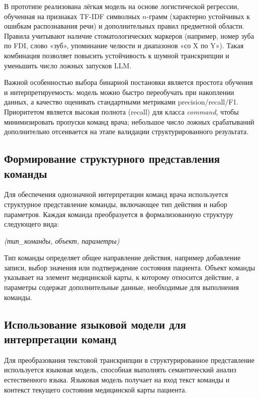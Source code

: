 В прототипе реализована лёгкая модель на основе логистической регрессии, обученная на признаках TF-IDF символных $n$-грамм (характерно устойчивых к ошибкам распознавания речи) и дополнительных правил предметной области.
Правила учитывают наличие стоматологических маркеров (например, номер зуба по FDI, слово «зуб», упоминание челюсти и диапазонов «со X по Y»).
Такая комбинация позволяет повысить устойчивость к шумной транскрипции и уменьшить число ложных запусков LLM.

Важной особенностью выбора бинарной постановки является простота обучения и интерпретируемость: модель можно быстро переобучать при накоплении данных, а качество оценивать стандартными метриками precision/recall/F1.
Приоритетом является высокая полнота (recall) для класса \textit{command}, чтобы минимизировать пропуски команд врача; небольшое число ложных срабатываний дополнительно отсеивается на этапе валидации структурированного результата.

\subsection{Формирование структурного представления команды}

Для обеспечения однозначной интерпретации команд врача используется структурное представление команды, включающее тип действия и набор параметров. Каждая команда преобразуется в формализованную структуру следующего вида:

\begin{center}
\textit{(тип\_команды, объект, параметры)}
\end{center}

Тип команды определяет общее направление действия, например добавление записи, выбор значения или подтверждение состояния пациента. Объект команды указывает на элемент медицинской карты, к которому относится действие, а параметры содержат дополнительные данные, необходимые для выполнения команды.

\subsection{Использование языковой модели для интерпретации команд}

Для преобразования текстовой транскрипции в структурированное представление используется языковая модель, способная выполнять семантический анализ естественного языка. Языковая модель получает на вход текст команды и контекст текущего состояния медицинской карты пациента.

